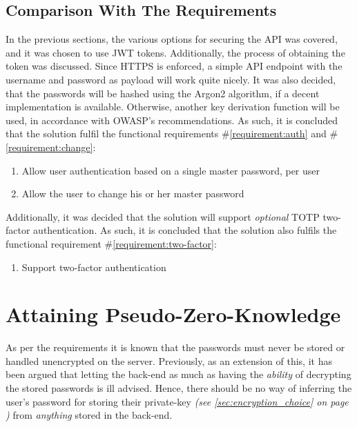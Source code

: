 		\subsection{Comparison With The Requirements}
			\label{requirement:fulfilled:auth}
			\label{requirement:fulfilled:change}
			\label{requirement:fulfilled:two-factor}
			In the previous sections, the various options for securing the API was covered, and it was chosen to use JWT tokens. Additionally, the process of obtaining the token was discussed. Since HTTPS is enforced, a simple API endpoint with the username and password as payload will work quite nicely. It was also decided, that the passwords will be hashed using the Argon2 algorithm, if a decent implementation is available. Otherwise, another key derivation function will be used, in accordance with OWASP's recommendations. As such, it is concluded that the solution fulfil the functional requirements \#\ref{requirement:auth} and \#\ref{requirement:change}:

			\vspace{-3ex}\begin{enumerate}
				\setlength\itemsep{0.1em}
				\setcounter{enumi}{14-1}
				\item Allow user authentication based on a single master password, per user
				\item Allow the user to change his or her master password
			\end{enumerate}

			Additionally, it was decided that the solution will support \emph{optional} TOTP two-factor authentication. As such, it is concluded that the solution also fulfils the functional requirement \#\ref{requirement:two-factor}:
			\vspace{-3ex}\begin{enumerate}
				\setlength\itemsep{0.1em}
				\setcounter{enumi}{16-1}
				\item Support two-factor authentication
			\end{enumerate}

	\section{Attaining Pseudo-Zero-Knowledge}
		As per the requirements it is known that the passwords must never be stored or handled unencrypted on the server. Previously, as an extension of this, it has been argued that letting the back-end as much as having the \emph{ability} of decrypting the stored passwords is ill advised. Hence, there should be no way of inferring the user's password for storing their private-key \emph{(see \ref{sec:encryption_choice} on page \pageref{sec:encryption_choice})} from \emph{anything} stored in the back-end.

